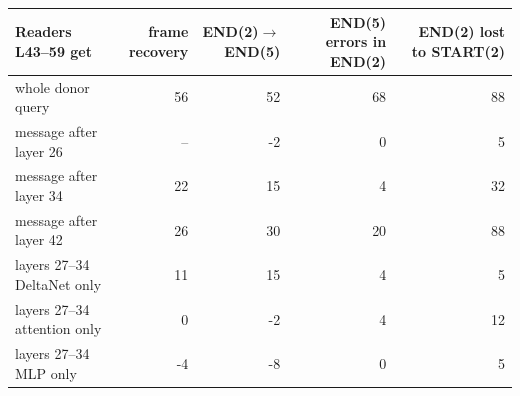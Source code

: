 \begin{tabular}{lrrrr}
\toprule
Readers L43--59 get & frame recovery & END(2)$\to$END(5) & END(5) errors in END(2) & END(2) lost to START(2) \\
\midrule
whole donor query & 56 & 52 & 68 & 88 \\
message after layer 26 & -- & -2 & 0 & 5 \\
message after layer 34 & 22 & 15 & 4 & 32 \\
message after layer 42 & 26 & 30 & 20 & 88 \\
layers 27--34 DeltaNet only & 11 & 15 & 4 & 5 \\
layers 27--34 attention only & 0 & -2 & 4 & 12 \\
layers 27--34 MLP only & -4 & -8 & 0 & 5 \\
\bottomrule
\end{tabular}
